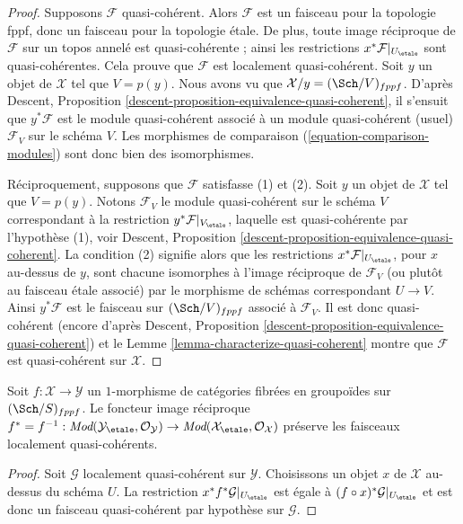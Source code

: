 \begin{proof}
Supposons $\mathcal{F}$ quasi-cohérent. Alors $\mathcal{F}$ est un faisceau
pour la topologie fppf, donc un faisceau pour la topologie étale. De plus,
toute image réciproque de $\mathcal{F}$ sur un topos annelé est quasi-cohérente ; ainsi
les restrictions $x^*\mathcal{F}|_{U_\etale}$ sont quasi-cohérentes.
Cela prouve que $\mathcal{F}$ est localement quasi-cohérent.
Soit $y$ un objet de $\mathcal{X}$ tel que $V = p(y)$.
Nous avons vu que $\mathcal{X}/y = (\Sch/V)_{fppf}$. D'après
Descent, Proposition \ref{descent-proposition-equivalence-quasi-coherent},
il s'ensuit que $y^*\mathcal{F}$ est le module quasi-cohérent
associé à un module quasi-cohérent (usuel) $\mathcal{F}_V$ sur
le schéma $V$. Les morphismes de comparaison
(\ref{equation-comparison-modules}) sont donc bien des isomorphismes.

\medskip\noindent
Réciproquement, supposons que $\mathcal{F}$ satisfasse (1) et (2).
Soit $y$ un objet de $\mathcal{X}$ tel que $V = p(y)$. Notons
$\mathcal{F}_V$ le module quasi-cohérent sur
le schéma $V$ correspondant à la restriction
$y^*\mathcal{F}|_{V_\etale}$, laquelle est quasi-cohérente par
l'hypothèse (1), voir
Descent, Proposition \ref{descent-proposition-equivalence-quasi-coherent}.
La condition (2) signifie alors que les restrictions
$x^*\mathcal{F}|_{U_\etale}$, pour $x$ au-dessus de $y$, sont chacune
isomorphes à l'image réciproque de $\mathcal{F}_V$ (ou plutôt au faisceau étale associé)
par le morphisme de schémas correspondant $U \to V$.
Ainsi $y^*\mathcal{F}$ est le faisceau sur $(\Sch/V)_{fppf}$
associé à $\mathcal{F}_V$. Il est donc quasi-cohérent (encore d'après
Descent, Proposition \ref{descent-proposition-equivalence-quasi-coherent})
et le Lemme \ref{lemma-characterize-quasi-coherent} montre que
$\mathcal{F}$ est quasi-cohérent sur $\mathcal{X}$.
\end{proof}

\begin{lemma}
\label{lemma-pullback-lqc}
Soit $f : \mathcal{X} \to \mathcal{Y}$ un $1$-morphisme de catégories
fibrées en groupoïdes sur $(\Sch/S)_{fppf}$. Le foncteur image réciproque
$f^* = f^{-1} :
\textit{Mod}(\mathcal{Y}_\etale, \mathcal{O}_\mathcal{Y})
\to
\textit{Mod}(\mathcal{X}_\etale, \mathcal{O}_\mathcal{X})$
préserve les faisceaux localement quasi-cohérents.
\end{lemma}

\begin{proof}
Soit $\mathcal{G}$ localement quasi-cohérent sur $\mathcal{Y}$.
Choisissons un objet $x$ de $\mathcal{X}$ au-dessus du schéma $U$.
La restriction $x^*f^*\mathcal{G}|_{U_\etale}$ est égale à
$(f \circ x)^*\mathcal{G}|_{U_\etale}$
et est donc un faisceau quasi-cohérent par hypothèse sur $\mathcal{G}$.
\end{proof}

